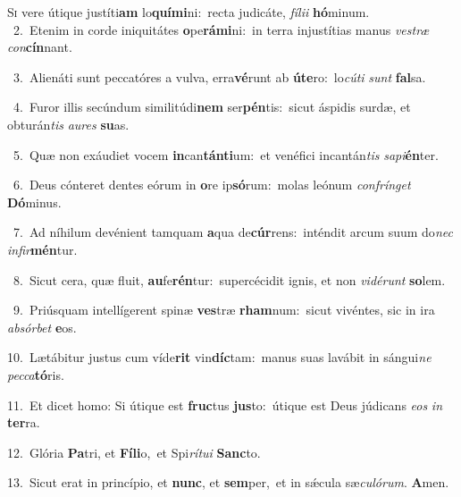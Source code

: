 \lettrine{\initial\textcolor{\initialcolor}{S}}{i} vere útique justíti\textbf{am} lo\-\textbf{quí}\-\textbf{mi}ni:~\star recta judicáte, \textit{fí}\-\textit{li}\textit{i} \textbf{hó}\-minum.\\
{\numbfont\textcolor{\numbcolor}{~2.}}~Etenim in corde iniquitátes \textbf{o}\-pe\-\textbf{rá}\-\textbf{mi}ni:~\star in terra injustítias manus \textit{ves}\-\textit{træ} \textit{con}\-\textbf{cín}nant.\par
{\numbfont\textcolor{\numbcolor}{~3.}}~Alienáti sunt peccatóres a vulva, erra\-\textbf{vé}\-runt ab \textbf{ú}\-\textbf{te}ro:~\star lo\-\textit{cú}\-\textit{ti} \textit{sunt} \textbf{fal}\-sa.\par
{\numbfont\textcolor{\numbcolor}{~4.}}~Furor illis secúndum similitúdi\textbf{nem} ser\-\textbf{pén}\-tis:~\star sicut áspidis surdæ, et obturán\textit{tis} \textit{au}\-\textit{res} \textbf{su}\-as.\par
{\numbfont\textcolor{\numbcolor}{~5.}}~Quæ non exáudiet vocem \textbf{in}\-can\-\textbf{tán}\-\textbf{ti}um:~\star et venéfici incantán\textit{tis} \textit{sa}\-\textit{pi}\textbf{én}ter.\par
{\numbfont\textcolor{\numbcolor}{~6.}}~Deus cónteret dentes eórum in \textbf{o}\-re ip\-\textbf{só}\-rum:~\star molas leónum \textit{con}\-\textit{frín}\textit{get} \textbf{Dó}\-minus.\par
{\numbfont\textcolor{\numbcolor}{~7.}}~Ad níhilum devénient tamquam \textbf{a}\-qua de\-\textbf{cúr}\-rens:~\star inténdit arcum suum do\textit{nec} \textit{in}\-\textit{fir}\textbf{mén}tur.\par
{\numbfont\textcolor{\numbcolor}{~8.}}~Sicut cera, quæ fluit, \textbf{au}\-fe\-\textbf{rén}\-tur:~\star supercécidit ignis, et non \textit{vi}\-\textit{dé}\textit{runt} \textbf{so}\-lem.\par
{\numbfont\textcolor{\numbcolor}{~9.}}~Priúsquam intellígerent spinæ \textbf{ves}\-træ \textbf{rham}\-num:~\star sicut vivéntes, sic in ira \textit{ab}\-\textit{sór}\textit{bet} \textbf{e}\-os.\par
{\numbfont\textcolor{\numbcolor}{10.}}~Lætábitur justus cum víde\textbf{rit} vin\-\textbf{díc}\-tam:~\star manus suas lavábit in sángui\textit{ne} \textit{pec}\-\textit{ca}\textbf{tó}ris.\par
{\numbfont\textcolor{\numbcolor}{11.}}~Et dicet homo: Si útique est \textbf{fruc}\-tus \textbf{jus}\-to:~\star útique est Deus júdicans \textit{e}\-\textit{os} \textit{in} \textbf{ter}\-ra.\par
{\numbfont\textcolor{\numbcolor}{12.}}~Glória \textbf{Pa}\-tri, et \textbf{Fí}\-\textbf{li}o,~\star et Spi\-\textit{rí}\-\textit{tu}\textit{i} \textbf{Sanc}\-to.\par
{\numbfont\textcolor{\numbcolor}{13.}}~Sicut erat in princípio, et \textbf{nunc}\-, et \textbf{sem}\-per,~\star et in sǽcula sæ\-\textit{cu}\-\textit{ló}\textit{rum}. \textbf{A}\-men.\par
